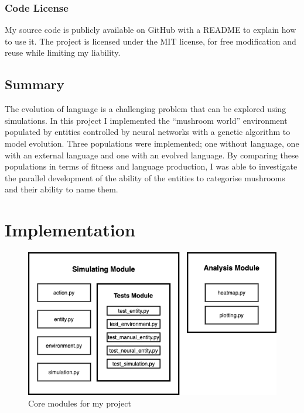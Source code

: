 \documentclass[12pt,a4paper]{report}
\begin{document}
\subsection{Code License}

My source code is publicly available on GitHub with a README to explain how to use it. The project is licensed under the MIT license, for free modification and reuse while limiting my liability.

\section{Summary}\label{section:summary}
The evolution of language is a challenging problem that can be explored using simulations. In this project I implemented the ``mushroom world'' environment populated by entities controlled by neural networks with a genetic algorithm to model evolution. Three populations were implemented; one without language, one with an external language and one with an evolved language. By comparing these populations in terms of fitness and language production, I was able to investigate the parallel development of the ability of the entities to categorise mushrooms and their ability to name them.


\chapter{Implementation}


\begin{figure}[t]
  \centering
  \includegraphics[width=.8\linewidth]{figs/modules}
  \caption{Core modules for my project}
  \label{fig:modules}
\end{figure}
\end{document}

